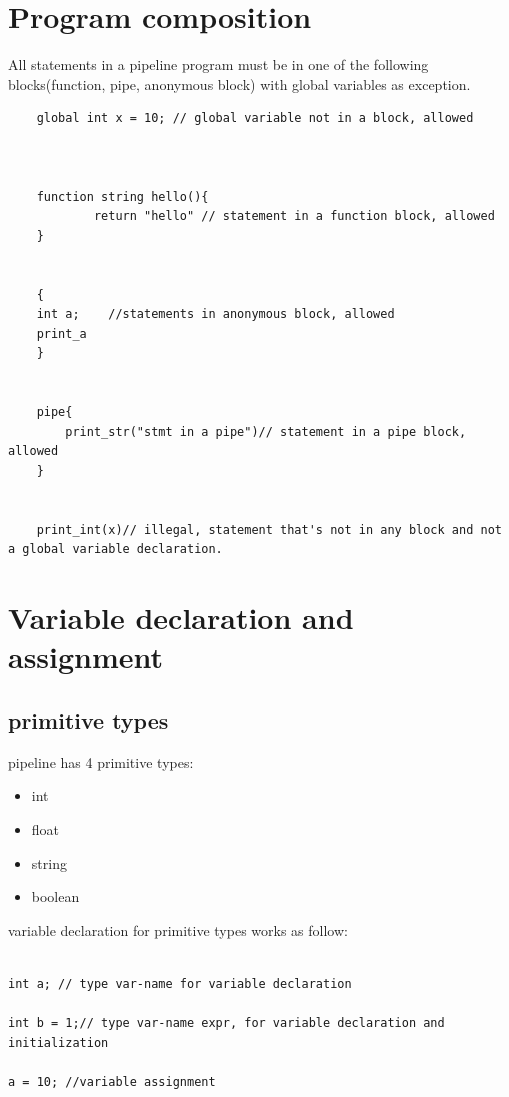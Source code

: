\documentclass[./Report_main.tex]{subfiles}
\begin{document}
\section{Program composition}
All statements in a pipeline program must be in one of the following blocks(function, pipe, anonymous block) with global variables as exception.\\
\begin{lstlisting}
    global int x = 10; // global variable not in a block, allowed
    
    
    
    function string hello(){
            return "hello" // statement in a function block, allowed
    }
    
    
    {
    int a;    //statements in anonymous block, allowed
    print_a
    }
    
    
    pipe{
        print_str("stmt in a pipe")// statement in a pipe block, allowed
    }
    
    
    print_int(x)// illegal, statement that's not in any block and not a global variable declaration.
\end{lstlisting}
\section{Variable declaration and assignment}
\subsection{primitive types}
pipeline has 4 primitive types:
\begin{itemize}
    \item int
    \item float
    \item string
    \item boolean
\end{itemize}
variable declaration for primitive types works as follow:
\begin{lstlisting}
    
int a; // type var-name for variable declaration
    
int b = 1;// type var-name expr, for variable declaration and initialization
    
a = 10; //variable assignment
\end{lstlisting}
\end{document}
